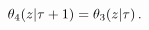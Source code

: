 \[\mathop{\theta_{4}\/}\nolimits\!\left(z\middle|\tau+1\right)=\mathop{\theta_{3%
}\/}\nolimits\!\left(z\middle|\tau\right).\]
